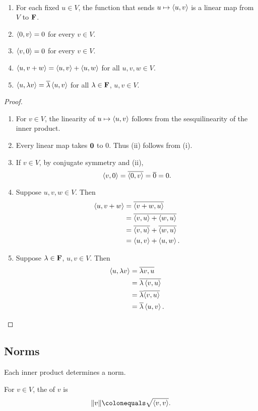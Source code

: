 \begin{lemma} \
\begin{enumerate}[label=(\roman*)]
\item For each fixed $u\in V$, the function that sends $u\mapsto\left\langle u,v\right\rangle$ is a linear map from $V$ to $\mathbf F$.
\item $\left\langle0,v\right\rangle=0$ for every $v\in V$.
\item $\left\langle v,0\right\rangle=0$ for every $v\in V$.
\item $\left\langle u,v+w\right\rangle=\left\langle u,v\right\rangle+\left\langle u,w\right\rangle$ for all $u,v,w\in V$.
\item $\left\langle u,\lambda v\right\rangle=\overline{\lambda}\left\langle u,v\right\rangle$ for all $\lambda\in\mathbf F$, $u,v\in V$.
\end{enumerate}
\end{lemma}

\begin{proof} \
\begin{enumerate}[label=(\roman*)]
\item For $v\in V$, the linearity of $u\mapsto\left\langle u,v\right\rangle$ follows from the sesquilinearity of the inner product.
\item Every linear map takes $\vb{0}$ to $0$. Thus (ii) follows from (i).
\item If $v\in V$, by conjugate symmetry and (ii),
\[\left\langle v,0\right\rangle=\overline{\left\langle0,v\right\rangle}=\overline{0}=0.\]
\item Suppose $u,v,w\in V$. Then
\begin{align*}
\left\langle u,v+w\right\rangle
&=\overline{\left\langle v+w,u\right\rangle}\\
&=\overline{\left\langle v,u\right\rangle+\left\langle w,u\right\rangle}\\
&=\overline{\left\langle v,u\right\rangle}+\overline{\left\langle w,u\right\rangle}\\
&=\left\langle u,v\right\rangle+\left\langle u,w\right\rangle.
\end{align*}
\item Suppose $\lambda\in\mathbf F$, $u,v\in V$. Then
\begin{align*}
\left\langle u,\lambda v\right\rangle
&=\overline{\lambda v,u}\\
&=\overline{\lambda\left\langle v,u\right\rangle}\\
&=\overline{\lambda}\overline{\left\langle v,u\right\rangle}\\
&=\overline{\lambda}\left\langle u,v\right\rangle.
\end{align*}
\end{enumerate}
\end{proof}
\pagebreak

\subsection{Norms}
Each inner product determines a norm.
\begin{definition}[Norm]
For $v\in V$, the  of $v$ is
\[\norm{v}\colonequals\sqrt{\angbrac{v,v}}.\]
\end{definition}

